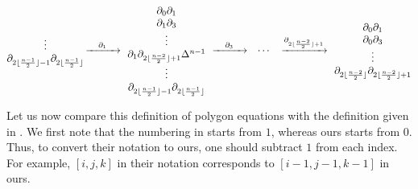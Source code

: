 \documentclass[10pt,a4paper]{amsart}
\numberwithin{equation}{section}
\theoremstyle{definition}
\begin{document}
\begin{gather*}
\begin{array}{@{}c@{\,}c@{\,}c@{\,}ccc@{\,}c@{}}
\begin{array}{@{}c@{}}
 \vdots\\
 \partial_{2\lfloor\frac{n-1}{2}\rfloor-1}\partial_{2\lfloor\frac{n-1}{2}\rfloor}\\
 \end{array}
 &
 \xrightarrow{\quad\partial_1\quad}
 &
 \begin{array}{c}
 \partial_0\partial_1\\
 \partial_1\partial_3\\
 \vdots\\
 \partial_1\partial_{2\lfloor\frac{n-2}{2}\rfloor+1}\Delta^{n-1}\\
 \vdots\\
 \partial_{2\lfloor\frac{n-1}{2}\rfloor-1}\partial_{2\lfloor\frac{n-1}{2}\rfloor}\\
 \end{array}
 &
 \xrightarrow{\quad\partial_3\quad}
 &
 \cdots
 &
 \xrightarrow{\partial_{2\lfloor\frac{n-2}{2}\rfloor+1}}
 &
 \begin{array}{c@{}}
 \partial_0\partial_1\\
 \partial_0\partial_3\\
 \vdots\\
 \partial_{2\lfloor\frac{n-2}{2}\rfloor}\partial_{2\lfloor\frac{n-2}{2}\rfloor+1}
 \end{array}
 \end{array}
\end{gather*}

Let us now compare this definition of polygon equations with the definition given in \cite{dimakis2015simplex}. We first note that the numbering in \cite{dimakis2015simplex} starts from $1$, whereas ours starts from $0$. Thus, to convert their notation to ours, one should subtract $1$ from each index. For example, $[i,j,k]$ in their notation corresponds to $[i-1,j-1,k-1]$ in ours.
\end{document}
